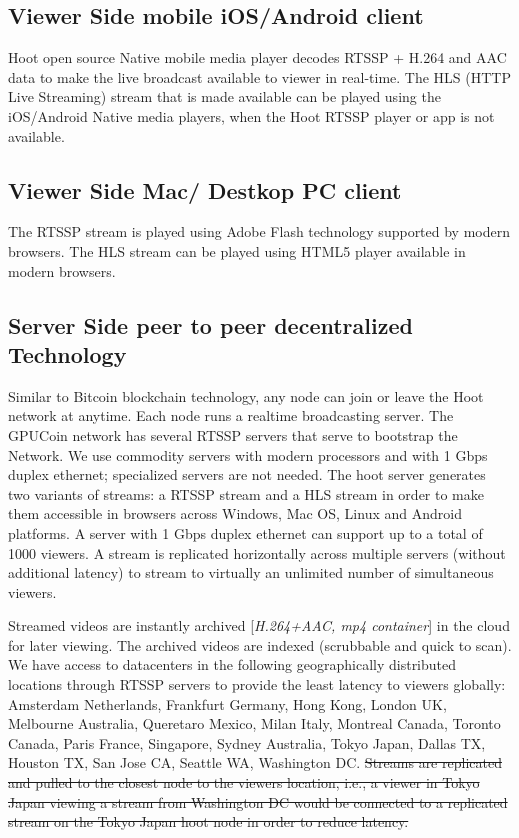 \subsection{Viewer Side mobile iOS/Android client }
 Hoot open source Native mobile media player decodes RTSSP + H.264 and AAC data to make the live broadcast available to viewer in real-time. The HLS (HTTP Live Streaming) stream that is made available can be played using the iOS/Android Native media players, when the Hoot RTSSP player or app is not available.

\subsection{Viewer Side Mac/ Destkop PC client} 
The RTSSP stream is played using Adobe Flash technology supported by modern browsers. The HLS stream can be played using HTML5 player available in modern browsers.

\subsection{Server Side peer to peer decentralized Technology}
Similar to Bitcoin blockchain technology, any node can join or leave the Hoot network at anytime. Each node runs a realtime broadcasting server.
The GPUCoin network has several RTSSP servers that serve to bootstrap the Network. We use commodity servers with modern processors and with 1 Gbps duplex ethernet; specialized servers are not needed. The hoot server generates two variants of streams: a RTSSP stream and a HLS stream in order to make them accessible in browsers across Windows, Mac OS, Linux and Android platforms. A server with 1 Gbps duplex ethernet can support up to a total of 1000 viewers. A stream is replicated horizontally across multiple servers (without additional latency) to stream to virtually an unlimited number of simultaneous viewers. 

Streamed videos are instantly archived [\emph{H.264+AAC, mp4 container}] in the cloud for later viewing. The archived videos are indexed (scrubbable and quick to scan). We have access to datacenters in the following geographically distributed locations through RTSSP servers to provide the least latency to viewers globally: Amsterdam Netherlands, Frankfurt Germany, Hong Kong, London UK, Melbourne Australia, Queretaro Mexico, Milan Italy, Montreal Canada, Toronto Canada, Paris France, Singapore, Sydney Australia, Tokyo Japan, Dallas TX, Houston TX, San Jose CA, Seattle WA, Washington DC. \sout{Streams are replicated and pulled to the closest node to the viewers location, i.e., a viewer in Tokyo Japan viewing a stream from Washington DC would be connected to a replicated stream on the Tokyo Japan hoot node in order to reduce latency.}

